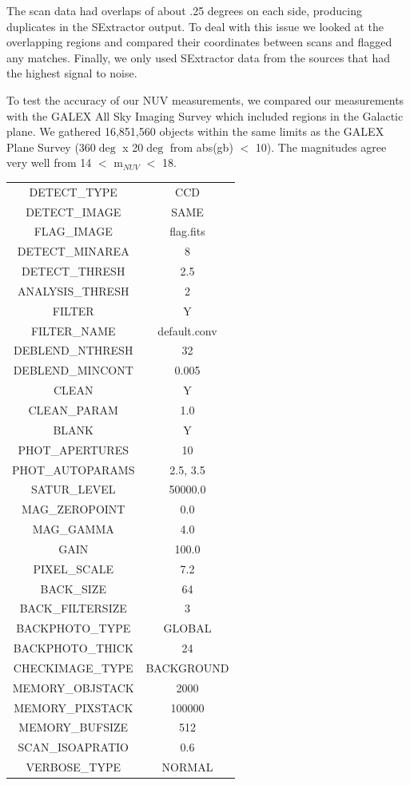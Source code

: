 \documentclass[12pt, preprint]{aastex}
\begin{document}
The scan data had overlaps of about .25 degrees on each side, producing duplicates in the SExtractor output. To deal with this issue we looked at the overlapping regions and compared their coordinates between scans and flagged any matches. Finally, we only used SExtractor data from the sources that had the highest signal to noise.

To test the accuracy of our NUV measurements, we compared our measurements with the GALEX All Sky Imaging Survey which included regions in the Galactic plane. We gathered 16,851,560 objects within the same limits as the GALEX Plane Survey (360$\deg$ x 20$\deg$ from abs(gb) $<$ 10). The magnitudes agree very well from 14 $<$ m$_{NUV}$ $<$ 18. 

\begin{table}
\begin{tabular}{cc}
DETECT\_TYPE & CCD \\
DETECT\_IMAGE & SAME \\
FLAG\_IMAGE & flag.fits \\
DETECT\_MINAREA & 8 \\
DETECT\_THRESH & 2.5 \\
ANALYSIS\_THRESH & 2 \\
FILTER & Y \\
FILTER\_NAME & default.conv \\
DEBLEND\_NTHRESH & 32 \\
DEBLEND\_MINCONT & 0.005 \\
CLEAN & Y \\
CLEAN\_PARAM & 1.0 \\
BLANK & Y \\
PHOT\_APERTURES & 10 \\
PHOT\_AUTOPARAMS & 2.5,  3.5 \\
SATUR\_LEVEL & 50000.0 \\
MAG\_ZEROPOINT & 0.0 \\
MAG\_GAMMA & 4.0 \\
GAIN & 100.0 \\
PIXEL\_SCALE & 7.2 \\
BACK\_SIZE & 64 \\
BACK\_FILTERSIZE & 3 \\
BACKPHOTO\_TYPE & GLOBAL \\
BACKPHOTO\_THICK & 24 \\
CHECKIMAGE\_TYPE & BACKGROUND \\
MEMORY\_OBJSTACK & 2000 \\
MEMORY\_PIXSTACK & 100000 \\
MEMORY\_BUFSIZE & 512 \\
SCAN\_ISOAPRATIO & 0.6 \\
VERBOSE\_TYPE & NORMAL \\
\end{tabular}
\end{table}

\clearpage

\clearpage
\end{document}
